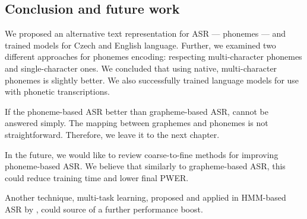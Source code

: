 \subsection{Conclusion and future work}
We proposed an alternative text representation for ASR --- phonemes --- and trained models for Czech and English language. Further, we examined two different approaches for phonemes encoding: respecting multi-character phonemes and single-character ones. We concluded that using native, multi-character phonemes is slightly better. We also successfully trained language models for use with phonetic transcriptions. 

If the phoneme-based ASR better than grapheme-based ASR, cannot be answered simply. The mapping between graphemes and phonemes is not straightforward. Therefore, we leave it to the next chapter.

In the future, we would like to review coarse-to-fine methods for improving phoneme-based ASR. We believe that similarly to grapheme-based ASR, this could reduce training time and lower final PWER. 

Another technique, multi-task learning, proposed and applied in HMM-based ASR by , could source of a further performance boost. 


